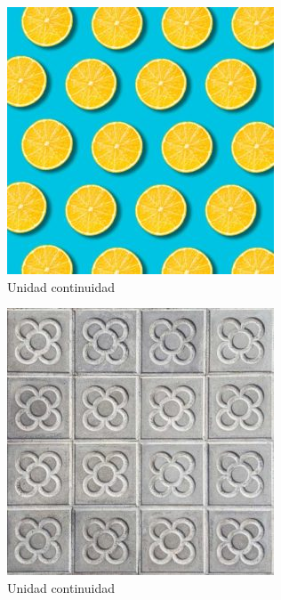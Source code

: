 \documentclass[16pt,]{krantz}
\theoremstyle{definition}
\theoremstyle{definition}
\theoremstyle{definition}
\theoremstyle{definition}
\theoremstyle{remark}
\begin{document}
\begin{figure}

{\centering \includegraphics[width=1\linewidth,height=1\textheight]{unidad2} 

}

\caption{Unidad continuidad}\label{fig:unidad2}
\end{figure}

\begin{figure}

{\centering \includegraphics[width=1\linewidth,height=1\textheight]{unidad3} 

}

\caption{Unidad continuidad}\label{fig:unidad3}
\end{figure}
\end{document}
